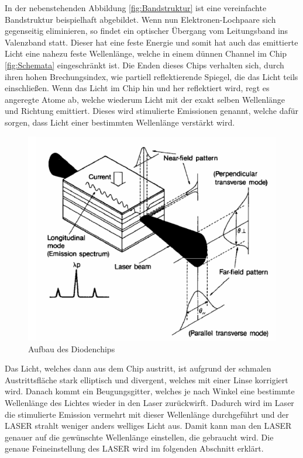 In der nebenstehenden Abbildung \eqref{fig:Bandstruktur} ist eine vereinfachte Bandstruktur beispielhaft abgebildet. 
Wenn nun Elektronen-Lochpaare sich gegenseitig eliminieren, so findet ein optischer Übergang vom Leitungsband ins Valenzband statt. 
Dieser hat eine feste Energie und somit hat auch das emittierte Licht eine nahezu feste Wellenlänge, 
welche in einem dünnen Channel im Chip \eqref{fig:Schemata} eingeschränkt ist. 
Die Enden dieses Chips verhalten sich, durch ihren hohen Brechungsindex, wie partiell reflektierende Spiegel, die das Licht teils einschließen. 
Wenn das Licht im Chip hin und her reflektiert wird, regt es angeregte Atome ab, welche wiederum Licht mit der exakt selben Wellenlänge und Richtung emittiert. 
Dieses wird stimulierte Emissionen genannt, welche dafür sorgen, dass Licht einer bestimmten Wellenlänge verstärkt wird.  

\begin{figure}[H]
    \centering
    \includegraphics[width=\textwidth]{Bilder/Schemata.png} 
    \caption{Aufbau des Diodenchips \cite{bk:LASER}}
    \label{fig:Schemata}
\end{figure}

Das Licht, welches dann aus dem Chip austritt, ist aufgrund der schmalen Austrittsfläche stark elliptisch und divergent, welches mit einer Linse korrigiert wird. 
Danach kommt ein Beugungsgitter, welches je nach Winkel eine bestimmte Wellenlänge des Lichtes wieder in den Laser zurückwirft. 
Dadurch wird im Laser die stimulierte Emission vermehrt mit dieser Wellenlänge durchgeführt und der LASER strahlt weniger anders welliges Licht aus.
Damit kann man den LASER genauer auf die gewünschte Wellenlänge einstellen, die gebraucht wird. 
Die genaue Feineinstellung des LASER wird im folgenden Abschnitt erklärt. 

